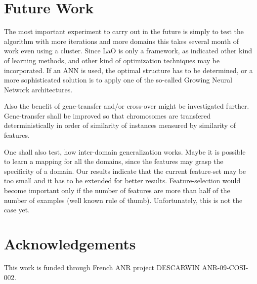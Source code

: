 \documentclass{MYsig-alternate}
\begin{document}
\section{Future Work}
\label{section:futurework}	

The most important experiment to carry out in the future is simply to test the algorithm with more iterations and more domains this takes several month of work even using a cluster. Since LaO is only a framework, as indicated other kind of learning methods, and other kind of optimization techniques may be incorporated. If an ANN is used, the optimal structure has to be determined, or a more sophisticated solution is to apply one of the so-called Growing Neural Network architectures.

Also the benefit of gene-transfer and/or cross-over might be investigated further. Gene-transfer shall be improved so that chromosomes are transfered deterministically in order of similarity of instances measured by similarity of features.

One shall also test, how inter-domain generalization works. Maybe it is possible to learn a mapping for all the domains, since the features may grasp the specificity of a domain. Our results indicate that the current feature-set may be too small and it has to be extended for better results. Feature-selection would become important only if the number of features are more than half of the number of examples (well known rule of thumb). Unfortunately, this is not the case yet.


\section{Acknowledgements}
This work is funded through French ANR project DESCARWIN ANR-09-COSI-002.




\end{document}
